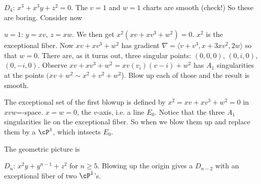 \begin{ex}
$D_4$: $x^3+x^3y+z^2=0$. The $v=1$ and $w=1$ charts are smooth (check!) So these are boring. Consider now

$u=1$: $y=xv$, $z=xw$. We then get $x^2(xv+xv^3+w^2)= 0$. $x^2$ is the exceptional fiber. Now $xv+xv^3+w^2$ has gradient $\nabla = \langle v+v^3, x+3xv^2, 2w \rangle$ so that $w=0$. There are, as it turns out, three singular points: $(0,0,0)$, $(0,i,0)$, $(0,-i,0)$. Observe $xv+xv^3+w^2= xv(v_i)(v-i)+w^2$ has $A_1$ singularities at the points $(xv+w^2 \sim x^2+v^2+w^2$). Blow up each of those and the result is smooth. 

The exceptional set of the first blowup is defined by $x^2= xv+xv^3+w^2=0$ in $xvw$=-space. $x=w=0$, the $v$-axis, i.e. a line $E_0$. Notice that the three $A_1$ singularities lie on the exceptional fiber. So when we blow them up and replace them by a $\cP^1$, which intsects $E_0$. 


The geometric picture is


\end{ex}



\begin{ex}
$D_n$: $x^2y+ y^{n-1}+z^2$ for $n \geq 5$. Blowing up the origin gives a $D_{n-2}$ with an exceptional fiber of two $\cP^1$'s. 
\end{ex}






